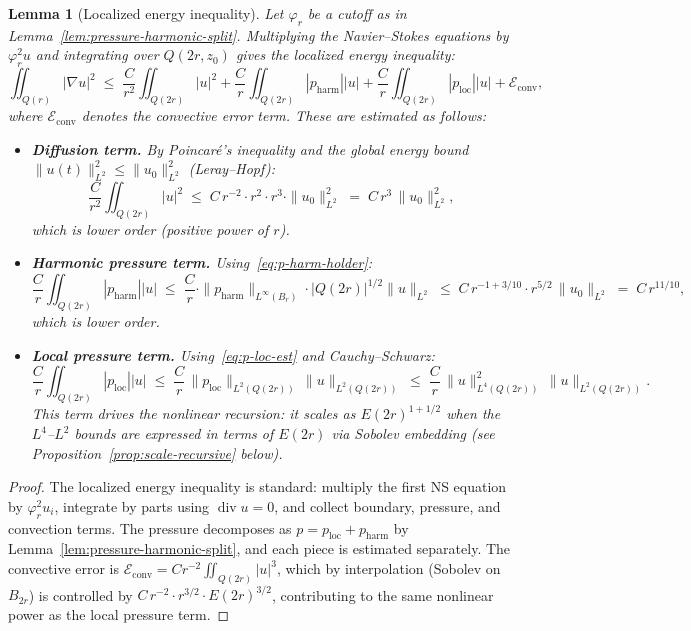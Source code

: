 \documentclass[11pt]{article}
\newtheorem{lemma}[theorem]{Lemma}
\theoremstyle{definition}
\theoremstyle{remark}
\begin{document}
\begin{lemma}[Localized energy inequality]\label{lem:localized-energy-ineq}
  Let $\varphi_r$ be a cutoff as in Lemma~\ref{lem:pressure-harmonic-split}.
  Multiplying the Navier--Stokes equations by $\varphi_r^2 u$ and integrating
  over $Q(2r,z_0)$ gives the localized energy inequality:
  \begin{equation}\label{eq:loc-energy-ineq}
    \iint_{Q(r)} |\nabla u|^2
    \;\leq\;
    \frac{C}{r^2}\iint_{Q(2r)}|u|^2
    + \frac{C}{r}\iint_{Q(2r)}|p_{\mathrm{harm}}||u|
    + \frac{C}{r}\iint_{Q(2r)}|p_{\mathrm{loc}}||u|
    + \mathcal{E}_{\mathrm{conv}},
  \end{equation}
  where $\mathcal{E}_{\mathrm{conv}}$ denotes the convective error term.  These
  are estimated as follows:
  \begin{itemize}
    \item \textbf{Diffusion term.}  By Poincar\'{e}'s inequality and the global
    energy bound $\|u(t)\|_{L^2}^2\leq\|u_0\|_{L^2}^2$ (Leray--Hopf):
    \[
      \frac{C}{r^2}\iint_{Q(2r)}|u|^2
      \;\leq\;
      C\,r^{-2}\cdot r^2\cdot r^3\cdot\|u_0\|_{L^2}^2
      \;=\; C\,r^3\,\|u_0\|_{L^2}^2,
    \]
    which is lower order (positive power of $r$).

    \item \textbf{Harmonic pressure term.}  Using~\eqref{eq:p-harm-holder}:
    \[
      \frac{C}{r}\iint_{Q(2r)}|p_{\mathrm{harm}}||u|
      \;\leq\;
      \frac{C}{r}\cdot\|p_{\mathrm{harm}}\|_{L^\infty(B_r)}\cdot|Q(2r)|^{1/2}\|u\|_{L^2}
      \;\leq\;
      C\,r^{-1+3/10}\cdot r^{5/2}\,\|u_0\|_{L^2}
      \;=\; C\,r^{11/10},
    \]
    which is lower order.

    \item \textbf{Local pressure term.}  Using~\eqref{eq:p-loc-est} and
    Cauchy--Schwarz:
    \[
      \frac{C}{r}\iint_{Q(2r)}|p_{\mathrm{loc}}||u|
      \;\leq\;
      \frac{C}{r}\,\|p_{\mathrm{loc}}\|_{L^2(Q(2r))}\,\|u\|_{L^2(Q(2r))}
      \;\leq\;
      \frac{C}{r}\,\|u\|_{L^4(Q(2r))}^2\,\|u\|_{L^2(Q(2r))}.
    \]
    This term drives the nonlinear recursion: it scales as $E(2r)^{1+1/2}$ when the
    $L^4$--$L^2$ bounds are expressed in terms of $E(2r)$ via Sobolev embedding
    (see Proposition~\ref{prop:scale-recursive} below).
  \end{itemize}
\end{lemma}

\begin{proof}
  The localized energy inequality is standard: multiply the first NS equation by
  $\varphi_r^2 u_i$, integrate by parts using $\operatorname{div}u=0$, and collect
  boundary, pressure, and convection terms.  The pressure decomposes as
  $p=p_{\mathrm{loc}}+p_{\mathrm{harm}}$ by Lemma~\ref{lem:pressure-harmonic-split},
  and each piece is estimated separately.  The convective error is
  $\mathcal{E}_{\mathrm{conv}}=C r^{-2}\iint_{Q(2r)}|u|^3$, which by interpolation
  (Sobolev on $B_{2r}$) is controlled by $C\,r^{-2}\cdot r^{3/2}\cdot E(2r)^{3/2}$,
  contributing to the same nonlinear power as the local pressure term.
\end{proof}
\end{document}
